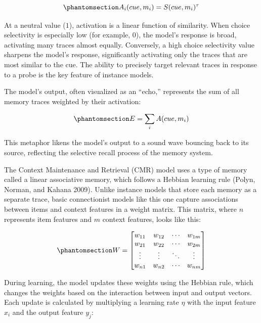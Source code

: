 \documentclass[
  letterpaper,
  11pt,
  english,
  singlespacing,
  headsepline]{MastersDoctoralThesis}
\begin{document}
\begin{equation}\phantomsection\label{eq-intro2}{
A_i(cue, m_i) = S(cue, m_i)^\tau
}\end{equation}

At a neutral value (\(1\)), activation is a linear function of
similarity. When choice selectivity is especially low (for example,
\(0\)), the model's response is broad, activating many traces almost
equally. Conversely, a high choice selectivity value sharpens the
model's response, significantly activating only the traces that are most
similar to the cue. The ability to precisely target relevant traces in
response to a probe is the key feature of instance models.

The model's output, often visualized as an ``echo,'' represents the sum
of all memory traces weighted by their activation:

\begin{equation}\phantomsection\label{eq-intro3}{
E = \sum_i A(cue, m_i)
}\end{equation}

This metaphor likens the model's output to a sound wave bouncing back to
its source, reflecting the selective recall process of the memory
system.

The Context Maintenance and Retrieval (CMR) model uses a type of memory
called a linear associative memory, which follows a Hebbian learning
rule (Polyn, Norman, and Kahana 2009). Unlike instance models that store
each memory as a separate trace, basic connectionist models like this
one capture associations between items and context features in a weight
matrix. This matrix, where \(n\) represents item features and \(m\)
context features, looks like this:

\begin{equation}\phantomsection\label{eq-intro4}{
W = \begin{bmatrix}
w_{11} & w_{12} & \cdots & w_{1m} \\
w_{21} & w_{22} & \cdots & w_{2m} \\
\vdots & \vdots & \ddots & \vdots \\
w_{n1} & w_{n2} & \cdots & w_{nm}
\end{bmatrix}
}\end{equation}

During learning, the model updates these weights using the Hebbian rule,
which changes the weights based on the interaction between input and
output vectors. Each update is calculated by multiplying a learning rate
\(\eta\) with the input feature \(x_i\) and the output feature \(y_j\):
\end{document}
